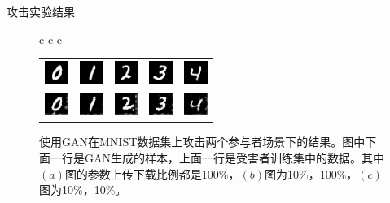 \documentclass[aspectratio=169]{beamer}
\begin{document}
\begin{frame}{攻击}{实验结果}
\begin{figure}[!ht]
\begin{tabular*}{\textwidth}{c c c}
{\begin{tabular}{lllll}
\includegraphics[width = 0.3in]{fig/original_for_sample_4_1650_100.png}  & \includegraphics[width = 0.3in]{fig/original_for_4_1610_200.png} & \includegraphics[width = 0.3in]{fig/original_for_4_1620_300.png} & \includegraphics[width = 0.3in]{fig/original_for_sample_4_1620_400.png} & \includegraphics[width = 0.3in]{fig/original_for_sample_5_1950_500.png}\\ 
\includegraphics[width = 0.3in]{fig/sample_4_epoch_1650_taskid_100.png}  & \includegraphics[width = 0.3in]{fig/sample_4_epoch_1610_taskid_200.png} & \includegraphics[width = 0.3in]{fig/sample_4_epoch_1620_taskid_300.png} & \includegraphics[width = 0.3in]{fig/sample_4_epoch_1620_taskid_400.png} & \includegraphics[width = 0.3in]{fig/sample_5_epoch_1950_taskid_500.png} \\ 
\end{tabular}
}
\end{tabular*}
\caption{使用GAN在MNIST数据集上攻击两个参与者场景下的结果。图中下面一行是GAN生成的样本，上面一行是受害者训练集中的数据。其中$(a)$图的参数上传下载比例都是100\%，$(b)$图为10\%，100\%，$(c)$图为10\%，10\%。}
\label{fig:ganresults}
\end{figure}
\end{frame}
\end{document}
